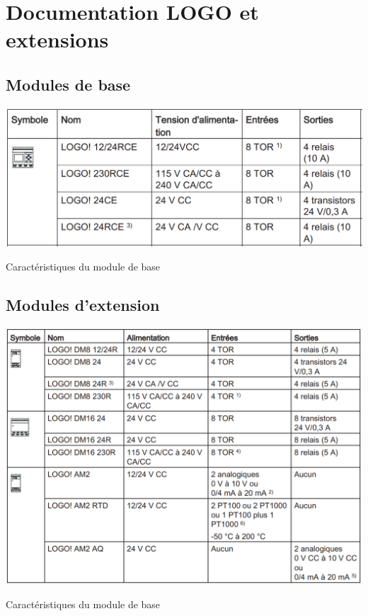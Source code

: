 \section{Documentation LOGO et extensions}
\label{sec:Documentation}
\subsection{Modules de base}
\begin{table}[h!]
    \centering
    \includegraphics[width=\textwidth,height=.4\textheight,keepaspectratio]{images/doc_base_logo}
    \caption{Caractéristiques du module de base}
\end{table}

\subsection{Modules d'extension}
\begin{table}[h!]
    \centering
    \includegraphics[width=\textwidth,height=.4\textheight,keepaspectratio]{images/doc_extension_logo.png}
    \caption{Caractéristiques du module de base}
\end{table}
\pagebreak
